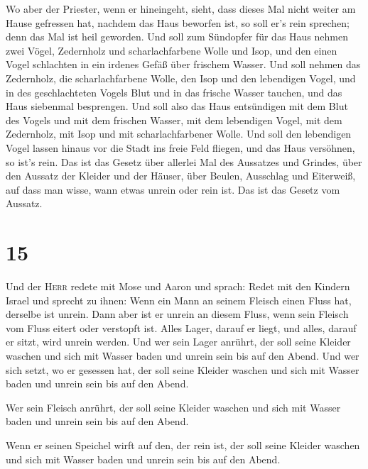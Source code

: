  Wo aber der Priester, wenn er hineingeht, sieht, dass
dieses Mal nicht weiter am Hause gefressen hat, nachdem das Haus
beworfen ist, so soll er's rein sprechen; denn das Mal ist heil
geworden.  Und soll zum Sündopfer für das Haus nehmen
zwei Vögel, Zedernholz und scharlachfarbene Wolle und Isop,
 und den einen Vogel schlachten in ein irdenes Gefäß über
frischem Wasser.  Und soll nehmen das Zedernholz, die
scharlachfarbene Wolle, den Isop und den lebendigen Vogel, und in des
geschlachteten Vogels Blut und in das frische Wasser tauchen, und das
Haus siebenmal besprengen.  Und soll also das Haus
entsündigen mit dem Blut des Vogels und mit dem frischen Wasser, mit dem
lebendigen Vogel, mit dem Zedernholz, mit Isop und mit scharlachfarbener
Wolle.  Und soll den lebendigen Vogel lassen hinaus vor
die Stadt ins freie Feld fliegen, und das Haus versöhnen, so ist's rein.
 Das ist das Gesetz über allerlei Mal des Aussatzes und
Grindes,  über den Aussatz der Kleider und der Häuser,
 über Beulen, Ausschlag und Eiterweiß, 
auf dass man wisse, wann etwas unrein oder rein ist. Das ist das Gesetz
vom Aussatz.

\hypertarget{section-14}{%
\section{15}\label{section-14}}

 Und der \textsc{Herr} redete mit Mose und Aaron und
sprach:  Redet mit den Kindern Israel und sprecht zu
ihnen: Wenn ein Mann an seinem Fleisch einen Fluss hat, derselbe ist
unrein.  Dann aber ist er unrein an diesem Fluss, wenn
sein Fleisch vom Fluss eitert oder verstopft ist.  Alles
Lager, darauf er liegt, und alles, darauf er sitzt, wird unrein werden.
 Und wer sein Lager anrührt, der soll seine Kleider
waschen und sich mit Wasser baden und unrein sein bis auf den Abend.
 Und wer sich setzt, wo er gesessen hat, der soll seine
Kleider waschen und sich mit Wasser baden und unrein sein bis auf den
Abend.

 Wer sein Fleisch anrührt, der soll seine Kleider waschen
und sich mit Wasser baden und unrein sein bis auf den Abend.

 Wenn er seinen Speichel wirft auf den, der rein ist, der
soll seine Kleider waschen und sich mit Wasser baden und unrein sein bis
auf den Abend.

